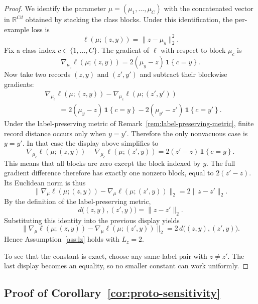 \documentclass[conference,compsoc]{IEEEtran}
\newcommand{\ind}[1]{\mathbf{1}\!\left\{#1\right\}}
\begin{document}
\begin{proof}
We identify the parameter $\mu=(\mu_1,\dots,\mu_C)$ with the concatenated vector in $\mathbb{R}^{Cd}$ obtained by stacking the class blocks. Under this identification, the per-example loss is
\[
\ell(\mu;(z,y))=\|z-\mu_y\|_2^2.
\]
Fix a class index $c\in\{1,\dots,C\}$. The gradient of $\ell$ with respect to block $\mu_c$ is
\[
\nabla_{\mu_c}\ell(\mu;(z,y))
=
2(\mu_y-z)\,\ind{c=y}.
\]
Now take two records $(z,y)$ and $(z',y')$ and subtract their blockwise gradients:
\[
\begin{aligned}
&\nabla_{\mu_c}\ell(\mu;(z,y))
-
\nabla_{\mu_c}\ell(\mu;(z',y')) \\
&\qquad =
2(\mu_y-z)\,\ind{c=y}
-
2(\mu_{y'}-z')\,\ind{c=y'}.
\end{aligned}
\]
Under the label-preserving metric of Remark~\ref{rem:label-preserving-metric}, finite record distance occurs only when $y=y'$. Therefore the only nonvacuous case is $y=y'$. In that case the display above simplifies to
\[
\nabla_{\mu_c}\ell(\mu;(z,y))-
\nabla_{\mu_c}\ell(\mu;(z',y))
=
2(z'-z)\,\ind{c=y}.
\]
This means that all blocks are zero except the block indexed by $y$. The full gradient difference therefore has exactly one nonzero block, equal to $2(z'-z)$. Its Euclidean norm is thus
\[
\|\nabla_\mu \ell(\mu;(z,y))-
\nabla_\mu \ell(\mu;(z',y))\|_2
=
2\|z-z'\|_2.
\]
By the definition of the label-preserving metric,
\[
d\big((z,y),(z',y)\big)=\|z-z'\|_2.
\]
Substituting this identity into the previous display yields
\[
\|\nabla_\mu \ell(\mu;(z,y))-
\nabla_\mu \ell(\mu;(z',y))\|_2
=
2\,d\big((z,y),(z',y)\big).
\]
Hence Assumption~\ref{ass:lz} holds with $L_z=2$.

To see that the constant is exact, choose any same-label pair with $z\neq z'$. The last display becomes an equality, so no smaller constant can work uniformly.
\end{proof}

\subsection{Proof of Corollary~\ref{cor:proto-sensitivity}}
\end{document}
